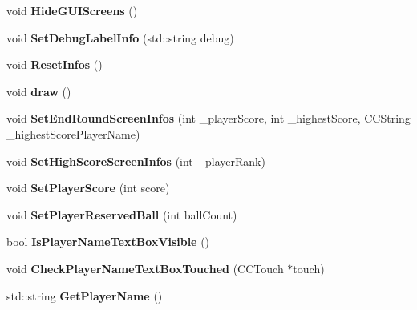 \begin{DoxyCompactItemize}
\item 
\hypertarget{class_j_g___game___g_u_i_a4c956efe3ed15d8e32d65affc2aa7a65}{void {\bfseries Hide\-G\-U\-I\-Screens} ()}\label{class_j_g___game___g_u_i_a4c956efe3ed15d8e32d65affc2aa7a65}

\item 
\hypertarget{class_j_g___game___g_u_i_a78d63ae05002fd82e1bcabf971f7a059}{void {\bfseries Set\-Debug\-Label\-Info} (std\-::string debug)}\label{class_j_g___game___g_u_i_a78d63ae05002fd82e1bcabf971f7a059}

\item 
\hypertarget{class_j_g___game___g_u_i_a57f38d08b8da17927d79eb50fa96695c}{void {\bfseries Reset\-Infos} ()}\label{class_j_g___game___g_u_i_a57f38d08b8da17927d79eb50fa96695c}

\item 
\hypertarget{class_j_g___game___g_u_i_aa1a358ee7434aa1c46e7b85a53e97f3f}{void {\bfseries draw} ()}\label{class_j_g___game___g_u_i_aa1a358ee7434aa1c46e7b85a53e97f3f}

\item 
\hypertarget{class_j_g___game___g_u_i_a250a8f4b46b5e20881564d87eebc87c4}{void {\bfseries Set\-End\-Round\-Screen\-Infos} (int \-\_\-player\-Score, int \-\_\-highest\-Score, C\-C\-String \-\_\-highest\-Score\-Player\-Name)}\label{class_j_g___game___g_u_i_a250a8f4b46b5e20881564d87eebc87c4}

\item 
\hypertarget{class_j_g___game___g_u_i_a6aeaa8103fe5e020189fccb30d29eddc}{void {\bfseries Set\-High\-Score\-Screen\-Infos} (int \-\_\-player\-Rank)}\label{class_j_g___game___g_u_i_a6aeaa8103fe5e020189fccb30d29eddc}

\item 
\hypertarget{class_j_g___game___g_u_i_afb682cc9a07f6d7feb9152b5cc5f14b6}{void {\bfseries Set\-Player\-Score} (int score)}\label{class_j_g___game___g_u_i_afb682cc9a07f6d7feb9152b5cc5f14b6}

\item 
\hypertarget{class_j_g___game___g_u_i_a59d66034539b81282ac21eeb05da2e4d}{void {\bfseries Set\-Player\-Reserved\-Ball} (int ball\-Count)}\label{class_j_g___game___g_u_i_a59d66034539b81282ac21eeb05da2e4d}

\item 
\hypertarget{class_j_g___game___g_u_i_a1ee44f474beb686224a7177789b41de0}{bool {\bfseries Is\-Player\-Name\-Text\-Box\-Visible} ()}\label{class_j_g___game___g_u_i_a1ee44f474beb686224a7177789b41de0}

\item 
\hypertarget{class_j_g___game___g_u_i_a1f02689e1fcf0219b4bbbd214d7d54a5}{void {\bfseries Check\-Player\-Name\-Text\-Box\-Touched} (C\-C\-Touch $\ast$touch)}\label{class_j_g___game___g_u_i_a1f02689e1fcf0219b4bbbd214d7d54a5}

\item 
\hypertarget{class_j_g___game___g_u_i_a2d092bd4b0e0aa3c2bd6da0e5e603d15}{std\-::string {\bfseries Get\-Player\-Name} ()}\label{class_j_g___game___g_u_i_a2d092bd4b0e0aa3c2bd6da0e5e603d15}

\end{DoxyCompactItemize}
